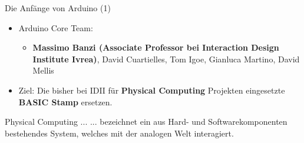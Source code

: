 \documentclass{beamer}
\begin{document}
\begin{frame}{Die Anf\"ange von Arduino (1)}
\begin{itemize}
 \item Arduino Core Team\cite{IEEE:2016:TheMakingOfArduino}:
 \begin{itemize}
  \item \textbf{Massimo Banzi (Associate Professor bei Interaction Design Institute Ivrea)}, David Cuartielles, Tom Igoe, Gianluca Martino, David Mellis
 \end{itemize}
\end{itemize}
\begin{itemize}
 \item Ziel: Die bisher bei IDII f\"ur \textbf{Physical Computing} Projekten eingesetzte \textbf{BASIC Stamp} ersetzen.
\end{itemize}
\begin{alertblock}{Physical Computing ...}
... bezeichnet ein aus Hard- und Softwarekomponenten bestehendes System, welches mit der analogen Welt interagiert.
\end{alertblock}
\end{frame}
\end{document}
